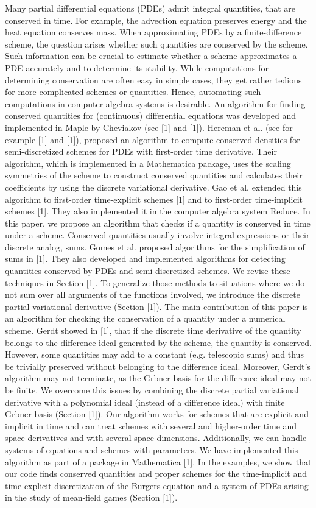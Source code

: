 \documentclass{article}
\begin{document}
Many partial differential equations (PDEs) admit integral quantities, that are conserved in time. 
For example, the advection equation preserves energy and the heat equation conserves mass. 
When approximating PDEs by a finite-difference scheme, the question arises whether such quantities are conserved by the scheme. 
Such information can be crucial to estimate whether a scheme approximates a PDE accurately and to determine its stability.
While computations for determining conservation are often easy in simple cases, they get rather tedious for more complicated schemes or quantities. 
Hence, automating such computations 
in computer algebra systems is desirable.
An algorithm for finding conserved quantities for (continuous) differential equations was developed and implemented  in {Maple} by Cheviakov (see [1] and [1]).
Hereman et al. (see for example [1] and [1]), proposed an algorithm to compute conserved densities for semi-discretized schemes for PDEs with first-order time derivative. 
Their algorithm, which is implemented in a {Mathematica} package, uses the scaling symmetries of the scheme to construct conserved quantities and calculates their coefficients by using the discrete variational derivative.
Gao et al. extended this algorithm to first-order time-explicit schemes [1] and to first-order time-implicit schemes [1]. 
They also implemented it in the computer algebra system {Reduce}.
In this paper, we propose an algorithm that checks if a quantity is conserved in time under a scheme.
Conserved quantities usually involve integral expressions or their discrete analog, sums.
Gomes et al. proposed algorithms for the simplification of sums in [1].
They also developed and implemented algorithms for detecting quantities conserved by PDEs and semi-discretized schemes. 
We revise these techniques in Section [1]. 
To generalize those methods to situations where we do not sum over all arguments of the functions involved, we introduce the discrete partial variational derivative (Section [1]).
The main contribution of this paper is an algorithm for checking the conservation of a quantity under a numerical scheme.
Gerdt showed in [1], that if the discrete time derivative of the quantity belongs to the difference ideal generated by the scheme, the quantity is conserved. However, some quantities may add to a constant (e.g. telescopic sums) and thus be trivially preserved without belonging to the difference ideal. Moreover, Gerdt's algorithm may not terminate, as the Gr{}bner basis for the difference ideal may not be finite.
We overcome this issues by combining the discrete partial variational derivative with a polynomial ideal (instead of a difference ideal) with finite Gr{}bner basis (Section [1]). 
Our algorithm works for schemes that are explicit and implicit in time and can treat schemes with several and higher-order time  and space derivatives and with several space dimensions.
Additionally, we can handle systems of equations and schemes with parameters. 
We have implemented this algorithm as part of a package in {Mathematica} [1].
In the examples, we show that our code finds conserved quantities and proper schemes for the time-implicit and time-explicit discretization of the Burgers equation and a system of PDEs arising in the study of mean-field games (Section [1]).
\end{document}
